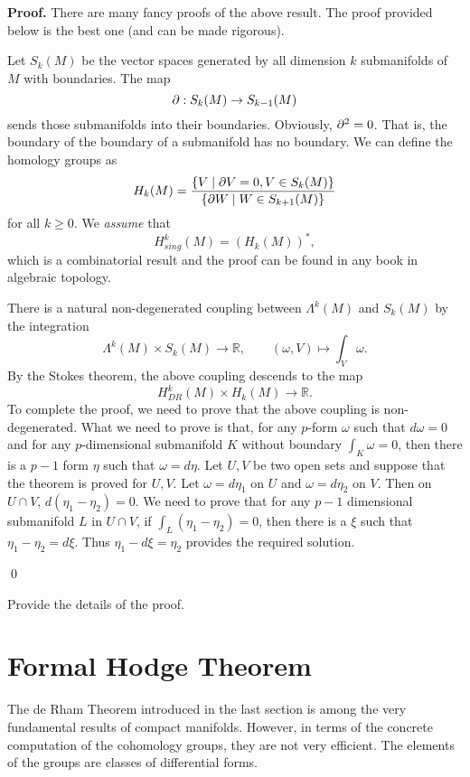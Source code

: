 {\bf Proof.} There are many fancy proofs of the above result. The proof provided below is the best one (and can be made rigorous).


Let $S_k(M)$ be the vector spaces generated by all dimension $k$ submanifolds of $M$ with boundaries. The map
\[
\partial: S_k(M)\to S_{k-1}(M)
\]
sends those submanifolds into their boundaries. Obviously, $\partial^2=0$. That is, the boundary of the boundary of a submanifold has no boundary.
We can define the homology groups as
\[
H_k(M)=\frac{\{V\mid \partial V=0,  V\in S_k(M)\}}{\{\partial W\mid W\in S_{k+1}(M)\}}
\]
for all $k\geq 0$. 
We {\it assume} that 
\[
H_{sing}^k(M)=(H_k(M))^*,
\]
which is a combinatorial result and the proof can be found in any book in algebraic topology.

There is a natural non-degenerated coupling between $\Lambda^k(M)$ and $S_k(M)$ by the integration
\[
\Lambda^k(M)\times S_k(M)\to \mathbb R,\qquad (\omega,V)\mapsto \int_V\omega.
\]
By the Stokes theorem, the above coupling descends to the map
\[
H^k_{DR}(M)\times H_k(M)\to\mathbb R.
\]
To complete the proof, we need to prove that the above coupling is non-degenerated. What we need to prove is that, for any $p$-form $\omega$ such that $d\omega=0$ and for any $p$-dimensional submanifold $K$ without boundary $\int_K\omega=0$, then there is a $p-1$ form $\eta$ such that $\omega=d\eta$. Let $U,V$ be two open sets and suppose that the theorem is proved for $U,V$. Let $\omega=d\eta_1$ on $U$ and $\omega=d\eta_2$ on $V$. Then on $U\cap V$, $d(\eta_1-\eta_2)=0$.
We need to prove that for any $p-1$ dimensional 
submanifold $L$ in $U\cap V$, if $\int _L(\eta_1-\eta_2)=0$, then there is a $\xi$ such that $\eta_1-\eta_2=d\xi$. Thus $\eta_1-d\xi=\eta_2$ provides the required solution.



\qed


\begin{ex} Provide the details of the proof.
\end{ex}

\section{Formal Hodge Theorem}

The de Rham  Theorem  introduced  in the last section is among the very fundamental results of
compact manifolds. However, in terms of the
concrete computation of the cohomology groups, they are not
very efficient.
The elements of the groups are classes of differential forms.

